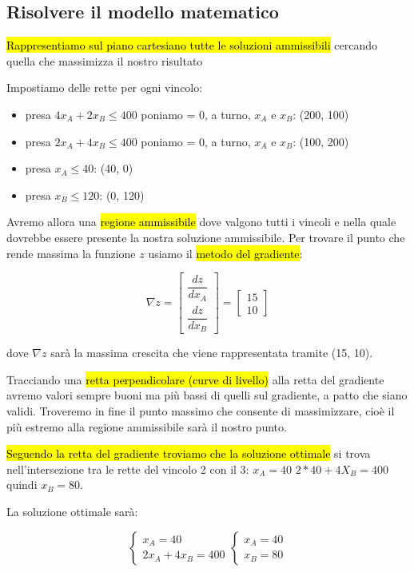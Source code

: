 \subsection{Risolvere il modello matematico}

\hl{Rappresentiamo sul piano cartesiano tutte le soluzioni ammissibili} cercando quella che massimizza il nostro risultato

Impostiamo delle rette per ogni vincolo:

\begin{itemize}
	\item presa $4x_A+2x_B \leq 400$ poniamo = 0, a turno, $x_A$ e $x_B$: (200, 100)
	\item presa $2x_A+4x_B \leq 400$ poniamo = 0, a turno, $x_A$ e $x_B$: (100, 200)
	\item presa $x_A \leq 40$: (40, 0)
	\item presa $x_B \leq 120$: (0, 120)
\end{itemize}


Avremo allora una \hl{regione ammissibile} dove valgono tutti i vincoli e nella quale dovrebbe essere presente la nostra soluzione ammissibile. Per trovare il punto che rende massima la funzione $z$ usiamo il \hl{metodo del gradiente}:

$$\nabla z = \left[\begin{array}{c}
	\dfrac{dz}{dx_A}\\
	\dfrac{dz}{dx_B}
\end{array}\right] = \left[\begin{array}{c}
	15\\
	10
\end{array}\right]
$$

dove $\nabla z$ sarà la massima crescita che viene rappresentata tramite (15, 10).

Tracciando una \hl{retta perpendicolare (curve di livello)} alla retta del gradiente avremo valori sempre buoni ma più bassi di quelli sul gradiente, a patto che siano validi. Troveremo in fine il punto massimo che consente di massimizzare, cioè il più estremo alla regione ammissibile sarà il nostro punto.

\hl{Seguendo la retta del gradiente troviamo che la soluzione ottimale} si trova nell'intersezione tra le rette del vincolo 2 con il 3: $x_A = 40$ $2*40+4X_B=400$ quindi $x_B=80$.

La soluzione ottimale sarà:

$$\begin{cases} 
    x_A = 40 \\ 
    2x_A+4x_B = 400
\end{cases}
\begin{cases} 
    x_A = 40 \\ 
    x_B = 80
\end{cases}$$


